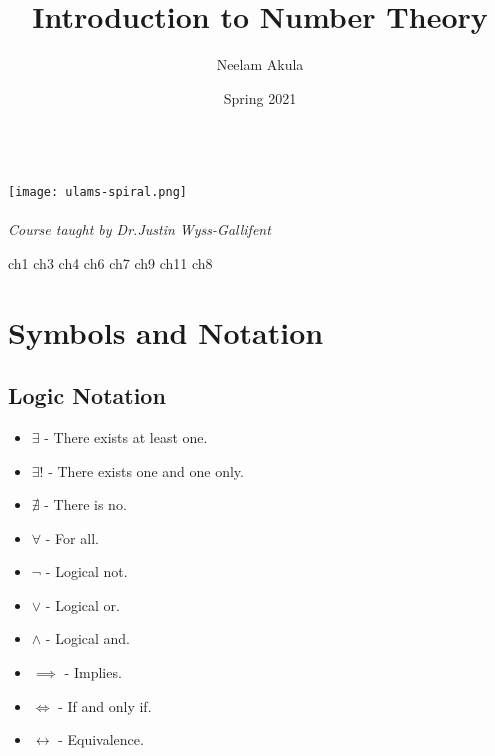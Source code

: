 \documentclass{article}
\title{Introduction to Number Theory}
\author{Neelam Akula}
\date{Spring 2021}
\begin{document}
\makeatletter
    \begin{titlepage}
        \begin{center}
            {\huge \bfseries  \@title }\\[4ex]
			\texttt{[image: ulams-spiral.png]}\\[4ex]
            {\large  \@author}\\[4ex] 
            {\large \@date}
			\vfill
			\emph{Course taught by Dr.Justin Wyss-Gallifent}
        \end{center}
    \end{titlepage}
\makeatother

\tableofcontents
\newpage
{ch1}
\newpage
{ch3}
\newpage
{ch4}
\newpage
{ch6}
\newpage
{ch7}
\newpage
{ch9}
\newpage
{ch11}
\newpage
{ch8}

\appendix
\newpage
\section{Symbols and Notation}
\subsection*{Logic Notation}
\begin{itemize}
    \item $\exists$ - There exists at least one.
    \item $\exists!$ - There exists one and one only.
    \item $\nexists$ - There is no.
    \item $\forall$ - For all.
    \item $\neg$ - Logical not.
    \item $\lor$ - Logical or.
    \item $\land$ - Logical and.
    \item $\implies$ - Implies.
    \item $\iff$ - If and only if.
    \item $\leftrightarrow$ - Equivalence.
\end{itemize}
\end{document}
